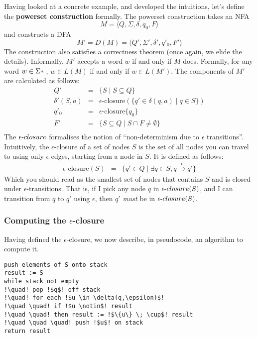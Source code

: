 Having looked at a concrete example, and developed the intuitions, let's define the \textbf{powerset construction} formally. The powerset construction takes an NFA
\[
M = \langle Q,\Sigma,\delta,q_0,F\rangle
\]
and constructs a DFA
\[
M' = D(M) = \langle Q',\Sigma',\delta',q'_0,F'\rangle
\]
The construction also satisfies a correctness theorem (once again, we elide the details). Informally, $M'$ accepts a word $w$ if and only if $M$ does. Formally, for any word $w \in \Sigma\*$, $w \in L(M)$ if and only if $w \in L(M')$. The components of $M'$ are calculated as follows:
\[
\begin{array}{rcl}
Q' &=& \{S \mid S \subseteq Q\}\\[1ex]
\delta'(S,a) &=& \epsilon\text{-closure}(\{q'\in\delta(q,a)\mid q \in S\})\\[1ex]
q'_0 &=& \epsilon\text{-closure}\{q_0\}\\[1ex]
F' &=& \{S \subseteq Q \mid S \cap F \neq \emptyset\}\\[1ex]
\end{array}
\]
The $\epsilon{\text-closure}$ formalises the notion of ``non-determinism due to $\epsilon$ transitions''. Intuitively, the $\epsilon$-closure of a set of nodes $S$ is the set of all nodes you can travel to using only $\epsilon$ edges, starting from a node in $S$. It is defined as follows:
\[
\begin{array}{rcl}
\epsilon\text{-closure}(S) &=& \{q' \in Q \mid \exists q \in S, q \xrightarrow{\epsilon}q'\}
\end{array}
\]
Which you should read as the smallest set of nodes that contains $S$ and is closed under $\epsilon$-transitions. That is, if I pick any node $q$ in $\epsilon{\text-closure}(S)$, and I can transition from $q$ to $q'$ using $\epsilon$, then $q'$ \textit{must} be in $\epsilon{\text-closure}(S)$.

\subsubsection{Computing the $\epsilon$-closure}
Having defined the $\epsilon$-closure, we now describe, in pseudocode, an algorithm to compute it.

\begin{lstlisting}[style=pseudocode]
push elements of S onto stack
result := S
while stack not empty
!\quad! pop !$q$! off stack
!\quad! for each !$u \in \delta(q,\epsilon)$!
!\quad \quad! if !$u \notin$! result
!\quad \quad! then result := !$\{u\} \; \cup$! result
!\quad \quad \quad! push !$u$! on stack
return result
\end{lstlisting}

